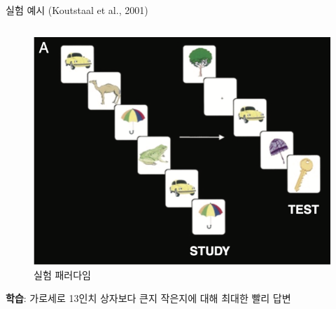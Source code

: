 \documentclass{beamer}
\begin{document}
\begin{frame}{실험 예시 (Koutstaal et al., 2001)}
  \begin{columns}
    \begin{column}{0.4\textwidth}
      \begin{figure}
        \centering
        \includegraphics[width=\textwidth]{image/Koutstaal}
        \caption{실험 패러다임}
      \end{figure}
      \vspace{-1em}
      \textbf{학습}: 가로세로 13인치 상자보다 큰지 작은지에 대해 최대한 빨리 답변\\~\\


\end{column}
\end{columns}
\end{frame}
\end{document}
